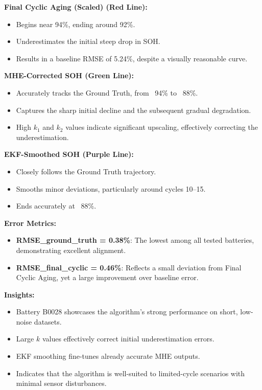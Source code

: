 \vspace{0.5em}
\textbf{Final Cyclic Aging (Scaled) (Red Line):}
\begin{itemize}
    \item Begins near 94\%, ending around 92\%.
    \item Underestimates the initial steep drop in SOH.
    \item Results in a baseline RMSE of 5.24\%, despite a visually reasonable curve.
\end{itemize}

\vspace{0.5em}
\textbf{MHE-Corrected SOH (Green Line):}
\begin{itemize}
    \item Accurately tracks the Ground Truth, from ~94\% to ~88\%.
    \item Captures the sharp initial decline and the subsequent gradual degradation.
    \item High $k_1$ and $k_2$ values indicate significant upscaling, effectively correcting the underestimation.
\end{itemize}

\vspace{0.5em}
\textbf{EKF-Smoothed SOH (Purple Line):}
\begin{itemize}
    \item Closely follows the Ground Truth trajectory.
    \item Smooths minor deviations, particularly around cycles 10--15.
    \item Ends accurately at ~88\%.
\end{itemize}

\vspace{0.5em}
\textbf{Error Metrics:}
\begin{itemize}
    \item \textbf{RMSE\_ground\_truth = 0.38\%}: The lowest among all tested batteries, demonstrating excellent alignment.
    \item \textbf{RMSE\_final\_cyclic = 0.46\%}: Reflects a small deviation from Final Cyclic Aging, yet a large improvement over baseline error.
\end{itemize}

\vspace{0.5em}
\textbf{Insights:}
\begin{itemize}
    \item Battery B0028 showcases the algorithm’s strong performance on short, low-noise datasets.
    \item Large $k$ values effectively correct initial underestimation errors.
    \item EKF smoothing fine-tunes already accurate MHE outputs.
    \item Indicates that the algorithm is well-suited to limited-cycle scenarios with minimal sensor disturbances.
\end{itemize}

